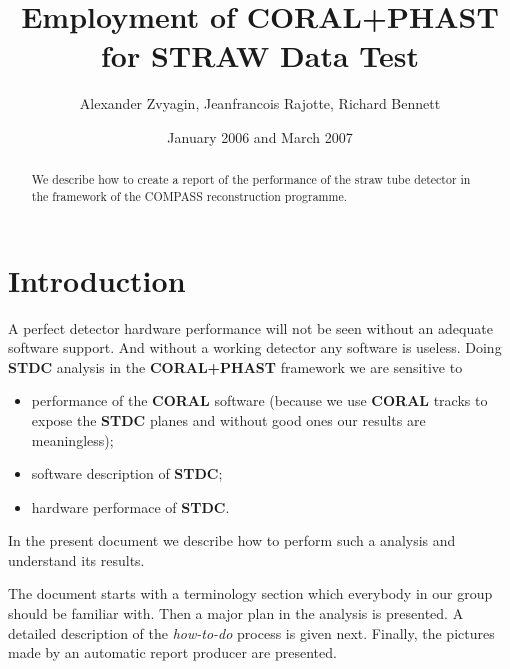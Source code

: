\documentclass[a4paper,12pt]{article}
\author{Alexander Zvyagin, Jeanfrancois Rajotte, Richard Bennett}
\title{Employment of CORAL+PHAST for STRAW Data Test}
\date{January 2006 and March 2007}
\begin{document}
\maketitle

    \begin{abstract}
        We describe how to create a report of the performance of the straw tube detector
        in the framework of the COMPASS reconstruction programme.
    \end{abstract}

\tableofcontents

\section{Introduction}
A perfect detector hardware performance will not be seen without an adequate
software support. And without a working detector any software is useless.
Doing {\bf STDC} analysis in the {\bf CORAL+PHAST} framework we are sensitive
to
\begin{itemize}
\item performance of the {\bf CORAL} software (because we use {\bf CORAL}
tracks to expose the {\bf STDC} planes and without good ones our results
are meaningless);
\item software description of {\bf STDC};
\item hardware performace of {\bf STDC}.
\end{itemize}
In the present document we describe how to perform such a analysis and
understand its results.

The document starts with a terminology section which everybody in our group should be familiar with. Then a major plan in the
analysis is presented. A detailed description of the {\it how-to-do} process
is given next. Finally, the pictures made by an automatic
report producer are presented.
\end{document}
